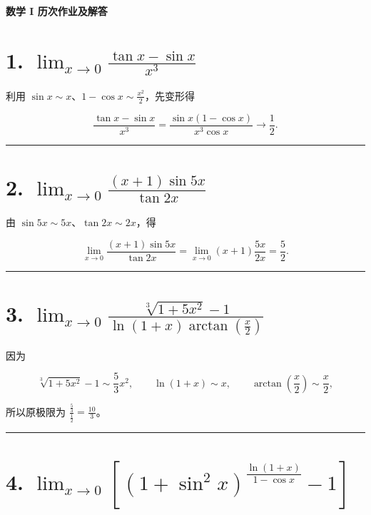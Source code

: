 \documentclass[11pt,a4paper,fontset=windows]{ctexart}
\begin{document}
\newCJKfontfamily{}
\begin{center}\LARGE\titlefont\bfseries 数学 I 历次作业及解答\end{center}\vspace{0.3em}

\section*{1. \(\displaystyle\lim_{x\to0}\frac{\tan x-\sin x}{x^3}\)}

利用 \(\sin x\sim x\)、\(1-\cos x\sim \frac{x^2}{2}\)，先变形得

\[
\frac{\tan x-\sin x}{x^3}
=\frac{\sin x(1-\cos x)}{x^3\cos x}
\longrightarrow\boxed{\frac12}.
\]

\par{}\vspace{0.5em}\hrule\vspace{0.2em}
\section*{2. \(\displaystyle\lim_{x\to0}\frac{(x+1)\sin5x}{\tan2x}\)}

由 \(\sin5x\sim5x\)、\(\tan2x\sim2x\)，得

\[
\lim_{x\to0}\frac{(x+1)\sin5x}{\tan2x}
=\lim_{x\to0}(x+1)\frac{5x}{2x}
=\boxed{\frac52}.
\]

\par{}\vspace{0.5em}\hrule\vspace{0.2em}
\section*{3. \(\displaystyle\lim_{x\to0}\frac{\sqrt[3]{1+5x^2}-1}{\ln(1+x)\arctan(\frac{x}{2})}\)}

因为

\[
\sqrt[3]{1+5x^2}-1\sim\frac53x^2,\qquad
\ln(1+x)\sim x,\qquad \arctan(\frac{x}{2})\sim\frac{x}{2},
\]

所以原极限为 \(\displaystyle\frac{\frac{5}{3}}{\frac{1}{2}}=\boxed{\frac{10}{3}}\)。

\par{}\vspace{0.5em}\hrule\vspace{0.2em}
\section*{4. \(\displaystyle\lim_{x\to0}\left[(1+\sin^2x)^{\frac{\ln(1+x)}{1-\cos x}}-1\right]\)}
\end{document}
